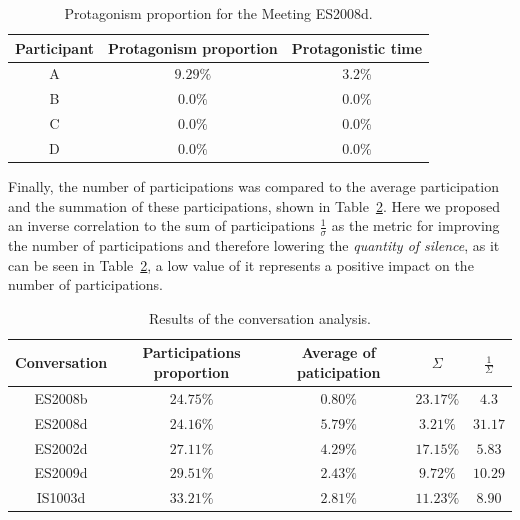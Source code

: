 \begin{table}[H]
    \centering
    \begin{tabular}{ccc}
    \hline
    Participant & Protagonism proportion & Protagonistic time\\ \hline 
    A           & $9.29\%$               & $3.2\%$            \\
    B           & $0.0\%$                & $0.0\%$            \\
    C           & $0.0\%$                & $0.0\%$            \\
    D           & $0.0\%$                & $0.0\%$            \\
    \hline
    \end{tabular}
    \caption{Protagonism proportion for the Meeting ES2008d.}
    \label{table:res_ES2008d}
\end{table}

Finally, the number of participations was compared to the average participation and the summation of these participations, shown in Table~\ref{table:results_ami}. Here we proposed an inverse correlation to the sum of participations $\frac{1}{\sigma}$ as the metric for improving the number of participations and therefore lowering the \textit{quantity of silence}, as it can be seen in Table~\ref{table:results_ami}, a low value of it represents a positive impact on the number of participations.\\

\begin{table}[H]
    \centering
    \begin{tabular}{ccccc}
    \hline
    Conversation & Participations proportion & Average  of paticipation & $\Sigma$ & $\frac{1}{\Sigma}$ \\ \hline
    ES2008b      & $24.75\%$                 & $0.80\%$                                                              & $23.17\%$  & $4.3$               \\
    ES2008d      & $24.16\%$                 & $5.79\%$                                                              & $3.21\%$   & $31.17$              \\
    ES2002d      & $27.11\%$                 & $4.29\%$                                                              & $17.15\%$  & $5.83$               \\
    ES2009d      & $29.51\%$                 & $2.43\%$                                                                & $9.72\%$   & $10.29$              \\
    IS1003d      & $33.21\%$                 & $2.81\%$                                                                & $11.23\%$  & $8.90$              \\
    \hline
    \end{tabular}
    \caption{Results of the conversation analysis.}
    \label{table:results_ami}
\end{table}


